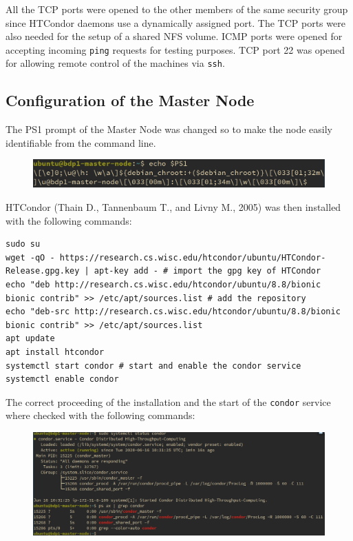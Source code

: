 \documentclass{article}
\begin{document}
All the TCP ports were opened to the other members of the same security group since HTCondor daemons use a dynamically assigned port.
The TCP ports were also needed for the setup of a shared NFS volume.
ICMP ports were opened for accepting incoming \texttt{ping} requests for testing purposes.
TCP port 22 was opened for allowing remote control of the machines via \texttt{ssh}.

\subsection{Configuration of the Master Node}
The PS1 prompt of the Master Node was changed so to make the node easily identifiable from the command line.

\begin{figure}[!h]
    \center
    \includegraphics[width=\textwidth]{./images/master-ps1.png}
\end{figure}

HTCondor (Thain D., Tannenbaum T., and Livny M., 2005) was then installed with the following commands:

\begin{lstlisting}
sudo su
wget -qO - https://research.cs.wisc.edu/htcondor/ubuntu/HTCondor-Release.gpg.key | apt-key add - # import the gpg key of HTCondor
echo "deb http://research.cs.wisc.edu/htcondor/ubuntu/8.8/bionic bionic contrib" >> /etc/apt/sources.list # add the repository
echo "deb-src http://research.cs.wisc.edu/htcondor/ubuntu/8.8/bionic bionic contrib" >> /etc/apt/sources.list
apt update
apt install htcondor
systemctl start condor # start and enable the condor service
systemctl enable condor
\end{lstlisting}

The correct proceeding of the installation and the start of the \texttt{condor} service where checked with the following commands:

\begin{figure}[!h]
    \center
    \includegraphics[width=\textwidth]{./images/condor_installed.png}
\end{figure}
\end{document}
